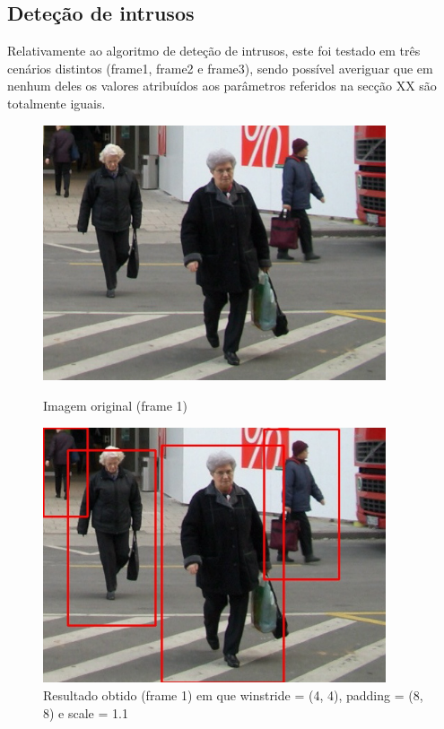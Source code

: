\subsection{Deteção de intrusos}

Relativamente ao algoritmo de deteção de intrusos, este foi testado em três cenários distintos (frame1, frame2 e frame3), sendo possível averiguar que em nenhum deles os valores atribuídos aos parâmetros referidos na secção XX são totalmente iguais.




\begin{figure}[h]
	\centering
	\begin{minipage}[b]{0.49\textwidth}
		\centering
		\includegraphics[width=0.9\textwidth]{img/vision/exemplos/frame1.jpg}
		\caption{Imagem original (frame 1) \newline \newline}
		\label{bluetth05-res}
	\end{minipage}
	\hfill
	\begin{minipage}[b]{0.49\textwidth}
		\centering
		\includegraphics[width=0.9\textwidth]{img/vision/exemplos/result_frame1.jpg}
		\caption{Resultado obtido (frame 1) em que  winstride = (4, 4), padding = (8, 8) e scale = 1.1}
		\label{comimageesquema}
	\end{minipage}
\end{figure}



